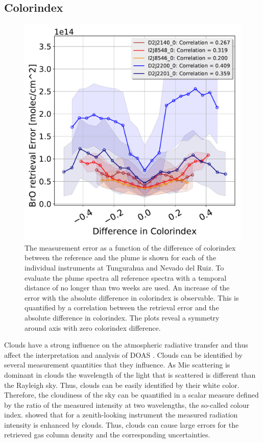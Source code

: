 \subsection{ Colorindex}
	\begin{figure}
	\centering
	\includegraphics[width=0.7\linewidth]{Bilder/DiffColidxallInstruments}
	\caption{The  measurement error as a function of the difference of colorindex between the reference and the plume is shown for each of the individual instruments at Tungurahua and Nevado del Ruiz. To evaluate the plume spectra all reference spectra with a temporal distance of no longer than two weeks are used. An increase of the  error with the absolute difference in colorindex is observable. This is quantified by a correlation between the  retrieval error and the absolute difference in colorindex. The plots reveal a symmetry around axis with zero colorindex difference. }
	\label{fig:diffcolidx}
\end{figure}
Clouds  have  a  strong  influence  on  the  atmospheric  radiative  transfer  and  thus  affect  the  interpretation  and  analysis of DOAS \citep{wagner2014cloud}.
Clouds can be identified by several measurement quantities that they influence.
As Mie scattering is dominant in clouds the wavelength of the light that is scattered is different than the Rayleigh sky. Thus, clouds can be easily identified by their white color.
Therefore, the cloudiness of the sky can be quantified in a scalar measure defined by the ratio of the measured intensity at two wavelengths, the so-called colour index.
\cite{wagner2014cloud} showed that for a zenith-looking instrument the measured radiation intensity is enhanced by clouds. Thus, clouds can cause large errors for the retrieved gas column density and the corresponding uncertainties. 
